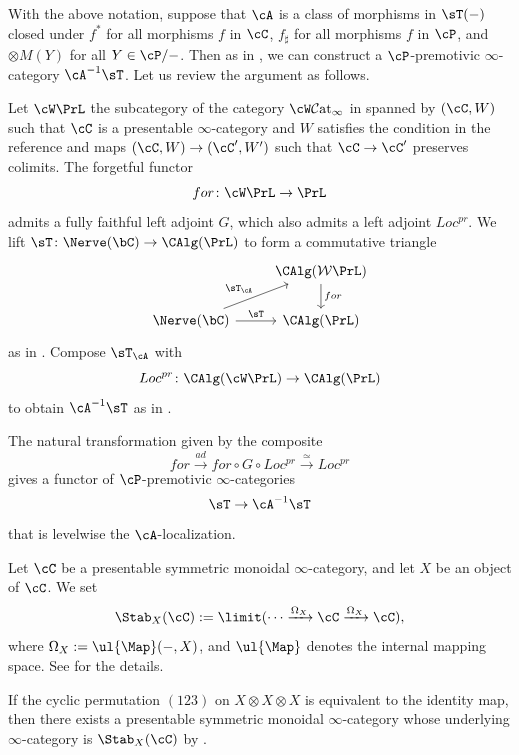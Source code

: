 \documentclass[10pt]{amsart}
\begin{document}
\begin{const}
\label{shv.8}
With the above notation, suppose that $\cA$ is a class of morphisms in $\sT(-)$ closed under $f^*$ for all morphisms $f$ in $\cC$, $f_\sharp$ for all morphisms $f$ in $\cP$, and $\otimes M(Y)$ for all $Y\in \cP/-$.
Then as in \cite[Section 9.1]{Robalothesis}, we can construct a $\cP$-premotivic $\infty$-category $\cA^{-1}\sT$.
Let us review the argument as follows.

Let $\cW\PrL$ the subcategory of the category $\cW\mathcal{C}\mathrm{at}_\infty$ in \cite[Construction 4.1.7.1]{HA} spanned by $(\cC,W)$ such that $\cC$ is a presentable $\infty$-category and $W$ satisfies the condition in the reference and maps $(\cC,W)\to (\cC',W')$ such that $\cC\to \cC'$ preserves colimits.
The forgetful functor
\[
for \colon \cW\PrL\to \PrL
\]
admits a fully faithful left adjoint $G$, which also admits a left adjoint $Loc^{pr}$.
We lift $\sT\colon \Nerve(\bC)\to \CAlg(\PrL)$ to form a commutative triangle
\[
\begin{tikzcd}
&
\CAlg(\mathcal{W}\PrL)\ar[d,"for"]
\\
\Nerve(\bC)\ar[r,"\sT"]\ar[ru,"\sT_{\cA}"]&
\CAlg(\PrL)
\end{tikzcd}
\]
as in \cite[Eq.\ 9.1.8]{Robalothesis}.
Compose $\sT_{\cA}$ with
\[
Loc^{pr} \colon \CAlg(\cW\PrL)\to \CAlg(\PrL)
\]
to obtain $\cA^{-1}\sT$ as in \cite[Eq.\ 9.1.10]{Robalothesis}.

The natural transformation given by the composite
\[
for \xrightarrow{ad} for\circ  G \circ Loc^{pr} \xrightarrow{\simeq} Loc^{pr}
\]
gives a functor of $\cP$-premotivic $\infty$-categories
\[
\sT \to \cA^{-1} \sT
\]
that is levelwise the $\cA$-localization.
\end{const}

\begin{df}
Let $\cC$ be a presentable symmetric monoidal $\infty$-category, and let $X$ be an object of $\cC$.
We set
\[
\Stab_X(\cC)
:=
\limit(\cdots \xrightarrow{\Omega_{X}} \cC\xrightarrow{\Omega_{X}} \cC),
\]
where $\Omega_{X}:=\ul{\Map}(-,X)$, and $\ul{\Map}$ denotes the internal mapping space.
See \cite[Section 2.2.1]{zbMATH06374152} for the details.

If the cyclic permutation $(123)$ on $X\otimes X\otimes X$ is equivalent to the identity map, then there exists a presentable symmetric monoidal $\infty$-category whose underlying $\infty$-category is $\Stab_X(\cC)$ by \cite[Corollary 2.22]{zbMATH06374152}.
\end{df}
\end{document}
